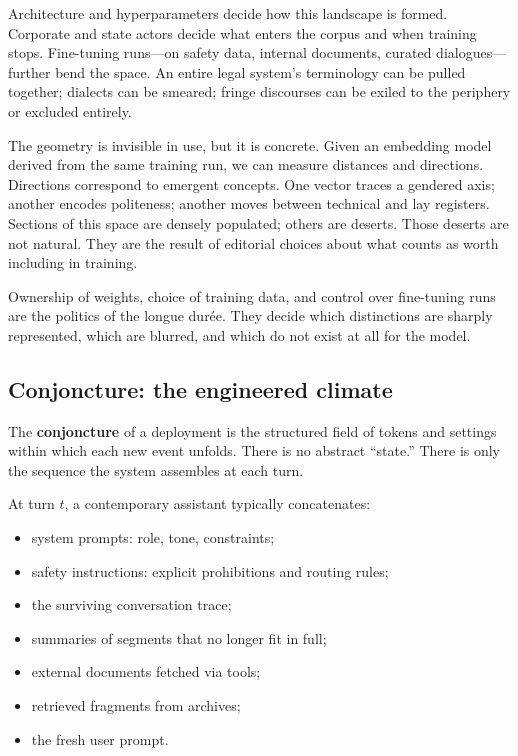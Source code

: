 \documentclass[12pt,a4paper]{article}
\begin{document}
Architecture and hyperparameters decide how this landscape is formed. Corporate and state actors decide what enters the corpus and when training stops. Fine-tuning runs---on safety data, internal documents, curated dialogues---further bend the space. An entire legal system's terminology can be pulled together; dialects can be smeared; fringe discourses can be exiled to the periphery or excluded entirely.

The geometry is invisible in use, but it is concrete. Given an embedding model derived from the same training run, we can measure distances and directions. Directions correspond to emergent concepts. One vector traces a gendered axis; another encodes politeness; another moves between technical and lay registers. Sections of this space are densely populated; others are deserts. Those deserts are not natural. They are the result of editorial choices about what counts as worth including in training.

Ownership of weights, choice of training data, and control over fine-tuning runs are the politics of the longue dur\'ee. They decide which distinctions are sharply represented, which are blurred, and which do not exist at all for the model.

\subsection{Conjoncture: the engineered climate}

The \textbf{conjoncture} of a deployment is the structured field of tokens and settings within which each new event unfolds. There is no abstract ``state.'' There is only the sequence the system assembles at each turn.

At turn $t$, a contemporary assistant typically concatenates:

\begin{itemize}
  \item system prompts: role, tone, constraints;
  \item safety instructions: explicit prohibitions and routing rules;
  \item the surviving conversation trace;
  \item summaries of segments that no longer fit in full;
  \item external documents fetched via tools;
  \item retrieved fragments from archives;
  \item the fresh user prompt.
\end{itemize}
\end{document}
